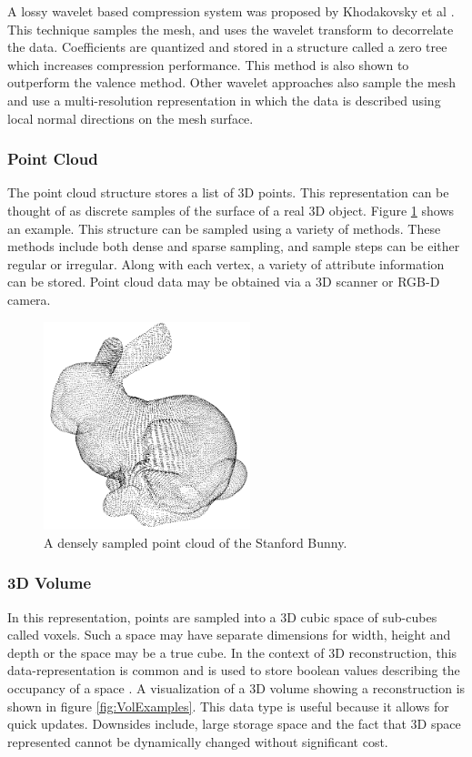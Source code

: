 A lossy wavelet based compression system was proposed by Khodakovsky et al \cite{Khodakovsky00Progressive}. This technique samples the mesh, and uses the wavelet transform to decorrelate the data. Coefficients are quantized and stored in a structure called a zero tree which increases compression performance. This method is also shown to outperform the valence method. Other wavelet approaches \cite{Guskov00Normal,Khodakovsky04Normalmesh} also sample the mesh and use a multi-resolution representation in which the data is described using local normal directions on the mesh surface. \\


\subsubsection{Point Cloud}

The point cloud structure stores a list of 3D points. This representation can be thought of as discrete samples of the surface of a real 3D object. Figure \ref{PointCloudExample} shows an example. This structure can be sampled using a variety of methods. These methods include both dense and sparse sampling, and sample steps can be either regular or irregular. Along with each vertex, a variety of attribute information can be stored. Point cloud data may be obtained via a 3D scanner or RGB-D camera. 

\begin{figure}[!htb]
\centering
\includegraphics[width=6cm]{images/ch2/PointCloudExample}
\caption{A densely sampled point cloud of the Stanford Bunny.}
\label{PointCloudExample}
\end{figure}


\subsubsection{3D Volume}

In this representation, points are sampled into a 3D cubic space of sub-cubes called voxels. Such a space may have separate dimensions for width, height and depth or the space may be a true cube. In the context of 3D reconstruction, this data-representation is common and is used to store boolean values describing the occupancy of a space \cite{Rusinkiewicz02Real}. A visualization of a 3D volume showing a reconstruction is shown in figure \ref{fig:VolExamples}. This data type is useful because it allows for quick updates. Downsides include, large storage space and the fact that 3D space represented cannot be dynamically changed without significant cost. \\


